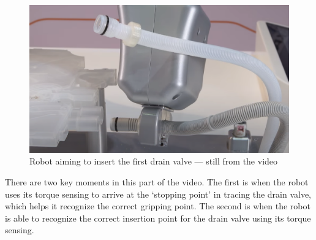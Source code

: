 \documentclass[conference]{IEEEtran}
\begin{document}
\begin{figure}[h!]
    \centering
    \includegraphics[scale=0.15]{kuka-drain-valve-insertion.png}
    \caption{Robot aiming to insert the first drain valve --- still from the video}
    \label{kuka-drain-valve-insertion}
\end{figure}

There are two key moments in this part of the video. The first is when the robot
uses its torque sensing to arrive at the `stopping point' in tracing the drain
valve, which helps it recognize the correct gripping point. The second is when
the robot is able to recognize the correct insertion point for the drain valve
using its torque sensing.



\end{document}
